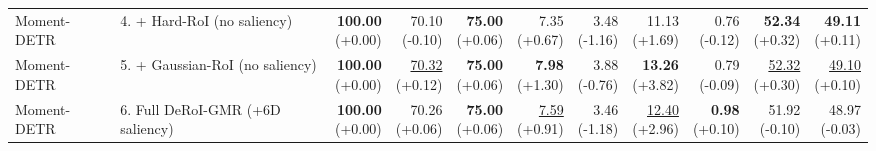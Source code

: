 \documentclass{article}
\begin{document}
{\begin{tabular}{llrrrrrrrrr}
Moment-DETR & 4. + Hard-RoI (no saliency) & \shortstack{\textbf{100.00} \\ {\scriptsize (+0.00)}} & \shortstack{70.10 \\ {\scriptsize (-0.10)}} & \shortstack{\textbf{75.00} \\ {\scriptsize (+0.06)}} & \shortstack{7.35 \\ {\scriptsize (+0.67)}} & \shortstack{3.48 \\ {\scriptsize (-1.16)}} & \shortstack{11.13 \\ {\scriptsize (+1.69)}} & \shortstack{0.76 \\ {\scriptsize (-0.12)}} & \shortstack{\textbf{52.34} \\ {\scriptsize (+0.32)}} & \shortstack{\textbf{49.11} \\ {\scriptsize (+0.11)}} \\
Moment-DETR & 5. + Gaussian-RoI (no saliency) & \shortstack{\textbf{100.00} \\ {\scriptsize (+0.00)}} & \shortstack{\underline{70.32} \\ {\scriptsize (+0.12)}} & \shortstack{\textbf{75.00} \\ {\scriptsize (+0.06)}} & \shortstack{\textbf{7.98} \\ {\scriptsize (+1.30)}} & \shortstack{3.88 \\ {\scriptsize (-0.76)}} & \shortstack{\textbf{13.26} \\ {\scriptsize (+3.82)}} & \shortstack{0.79 \\ {\scriptsize (-0.09)}} & \shortstack{\underline{52.32} \\ {\scriptsize (+0.30)}} & \shortstack{\underline{49.10} \\ {\scriptsize (+0.10)}} \\
Moment-DETR & 6. Full DeRoI-GMR (+6D saliency) & \shortstack{\textbf{100.00} \\ {\scriptsize (+0.00)}} & \shortstack{70.26 \\ {\scriptsize (+0.06)}} & \shortstack{\textbf{75.00} \\ {\scriptsize (+0.06)}} & \shortstack{\underline{7.59} \\ {\scriptsize (+0.91)}} & \shortstack{3.46 \\ {\scriptsize (-1.18)}} & \shortstack{\underline{12.40} \\ {\scriptsize (+2.96)}} & \shortstack{\textbf{0.98} \\ {\scriptsize (+0.10)}} & \shortstack{51.92 \\ {\scriptsize (-0.10)}} & \shortstack{48.97 \\ {\scriptsize (-0.03)}} \\

\end{tabular}}
\end{document}
